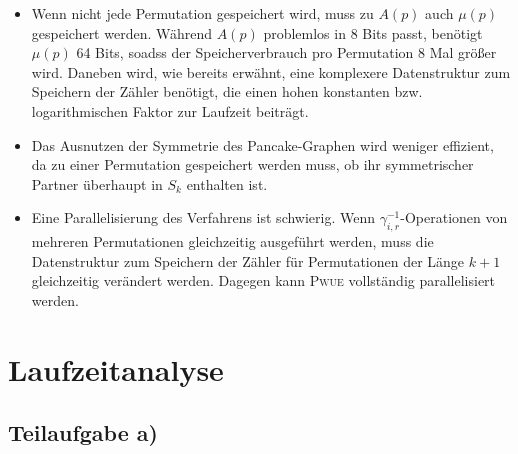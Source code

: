 \documentclass[a4paper, 11pt, ngerman]{article}
\begin{document}
\begin{itemize}
    \item Wenn nicht jede Permutation gespeichert wird, muss zu $A(p)$ auch $\mu(p)$ gespeichert werden. Während $A(p)$ problemlos in 8 Bits passt, benötigt $\mu(p)$ 64 Bits, soadss der Speicherverbrauch pro Permutation 8 Mal größer wird. Daneben wird, wie bereits erwähnt, eine komplexere Datenstruktur zum Speichern der Zähler benötigt, die einen hohen konstanten bzw. logarithmischen Faktor zur Laufzeit beiträgt.
    \item Das Ausnutzen der Symmetrie des Pancake-Graphen wird weniger effizient, da zu einer Permutation gespeichert werden muss, ob ihr symmetrischer Partner überhaupt in $S_k$ enthalten ist.
    \item Eine Parallelisierung des Verfahrens ist schwierig. Wenn $\gamma_{i, r}^{-1}$-Operationen von mehreren Permutationen gleichzeitig ausgeführt werden, muss die Datenstruktur zum Speichern der Zähler für Permutationen der Länge $k + 1$ gleichzeitig verändert werden. Dagegen kann \textsc{Pwue} vollständig parallelisiert werden.
\end{itemize}

\section{Laufzeitanalyse}

\subsection{Teilaufgabe a)}
\end{document}
